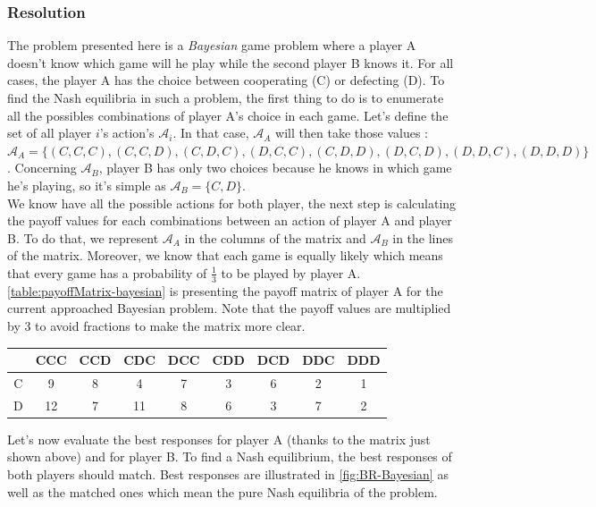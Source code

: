 \documentclass{article}
\begin{document}
\subsubsection*{Resolution}
The problem presented here is a \textit{Bayesian} game problem where a player A doesn't know which game will he play while the second player B knows it. For all cases, the player A has the choice between cooperating (C) or defecting (D). To find the Nash equilibria in such a problem, the first thing to do is to enumerate all the possibles combinations of player A's choice in each game. Let's define the set of all player $i$'s action's $\mathcal{A}_{i}$. In that case, $\mathcal{A}_{A}$ will then take those values : $\mathcal{A}_{A} = \{(C,C,C), (C,C,D), (C,D,C), (D,C,C), (C,D,D), (D,C,D), (D,D,C), (D,D,D)\}$. Concerning $\mathcal{A}_{B}$, player B has only two choices because he knows in which game he's playing, so it's simple as $\mathcal{A}_{B} = \{C,D\}$.\\

We know have all the possible actions for both player, the next step is calculating the payoff values for each combinations between an action of player A and player B. To do that, we represent $\mathcal{A}_{A}$ in the columns of the matrix and $\mathcal{A}_{B}$ in the lines of the matrix. Moreover, we know that each game is equally likely which means that every game has a probability of $\frac{1}{3}$ to be played by player A. \autoref{table:payoffMatrix-bayesian} is presenting the payoff matrix of player A for the current approached Bayesian problem. Note that the payoff values are multiplied by 3 to avoid fractions to make the matrix more clear. \\

\begin{center}
\begin{tabular}{|c|c|c|c|c|c|c|c|c|}
  \hline
  			   & CCC & CCD & CDC & DCC & CDD & DCD & DDC & DDD \\
  \hline
  C & 9 & 8 & 4 & 7 & 3 & 6 & 2 & 1 \\
  \hline
  D & 12 & 7 & 11 & 8 & 6 & 3 & 7 & 2 \\
  \hline
\end{tabular}
\label{table:payoffMatrix-bayesian}
\end{center}

Let's now evaluate the best responses for player A (thanks to the matrix just shown above) and for player B. To find a Nash equilibrium, the best responses of both players should match. Best responses are illustrated in \autoref{fig:BR-Bayesian} as well as the matched ones which mean the pure Nash equilibria of the problem. 
\end{document}

